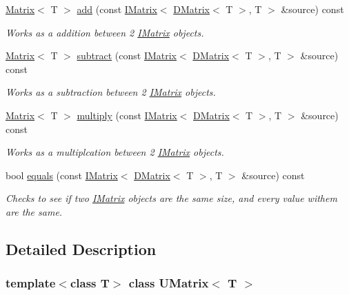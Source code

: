 \begin{DoxyCompactItemize}
\mbox{\hyperlink{class_matrix}{Matrix}}$<$ T $>$ \mbox{\hyperlink{class_u_matrix_a547418e355299d72e50f3cd0991c21a1}{add}} (const \mbox{\hyperlink{class_i_matrix}{I\+Matrix}}$<$ \mbox{\hyperlink{class_d_matrix}{D\+Matrix}}$<$ T $>$, T $>$ \&source) const
\begin{DoxyCompactList}\small\item\em Works as a addition between 2 \mbox{\hyperlink{class_i_matrix}{I\+Matrix}} objects. \end{DoxyCompactList}\item 
\mbox{\hyperlink{class_matrix}{Matrix}}$<$ T $>$ \mbox{\hyperlink{class_u_matrix_af3afe64e710c05db67f5156a3759a0f1}{subtract}} (const \mbox{\hyperlink{class_i_matrix}{I\+Matrix}}$<$ \mbox{\hyperlink{class_d_matrix}{D\+Matrix}}$<$ T $>$, T $>$ \&source) const
\begin{DoxyCompactList}\small\item\em Works as a subtraction between 2 \mbox{\hyperlink{class_i_matrix}{I\+Matrix}} objects. \end{DoxyCompactList}\item 
\mbox{\hyperlink{class_matrix}{Matrix}}$<$ T $>$ \mbox{\hyperlink{class_u_matrix_ad0c8892c5f39a8d51d5537a6b59a8742}{multiply}} (const \mbox{\hyperlink{class_i_matrix}{I\+Matrix}}$<$ \mbox{\hyperlink{class_d_matrix}{D\+Matrix}}$<$ T $>$, T $>$ \&source) const
\begin{DoxyCompactList}\small\item\em Works as a multiplcation between 2 \mbox{\hyperlink{class_i_matrix}{I\+Matrix}} objects. \end{DoxyCompactList}\item 
bool \mbox{\hyperlink{class_u_matrix_ac6de19bd23b538a291c01dc2f330d450}{equals}} (const \mbox{\hyperlink{class_i_matrix}{I\+Matrix}}$<$ \mbox{\hyperlink{class_d_matrix}{D\+Matrix}}$<$ T $>$, T $>$ \&source) const
\begin{DoxyCompactList}\small\item\em Checks to see if two \mbox{\hyperlink{class_i_matrix}{I\+Matrix}} objects are the same size, and every value withem are the same. \end{DoxyCompactList}\end{DoxyCompactItemize}


\subsection{Detailed Description}
\subsubsection*{template$<$class T$>$\newline
class U\+Matrix$<$ T $>$}

